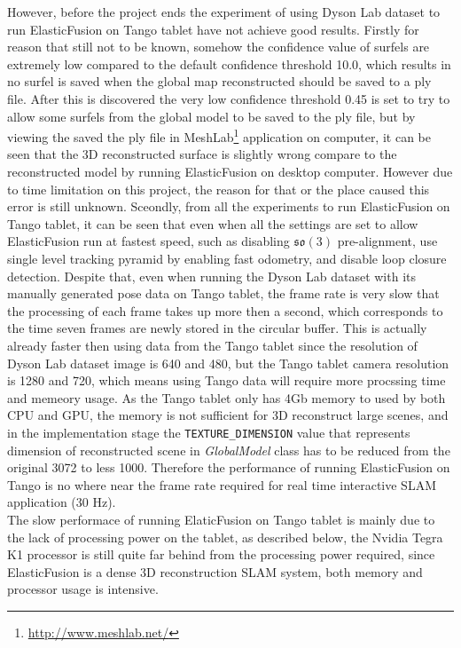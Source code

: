 \documentclass[12pt,twoside]{article}
\begin{document}
However, before the project ends the experiment of using Dyson Lab dataset to run ElasticFusion on Tango tablet have not achieve good results. Firstly for reason that still not to be known, somehow the confidence value of surfels are extremely low compared to the default confidence threshold 10.0, which results in no surfel is saved when the global map reconstructed should be saved to a ply file. After this is discovered the very low confidence threshold 0.45 is set to try to allow some surfels from the global model to be saved to the ply file, but by viewing the saved the ply file in MeshLab\footnote{\url{http://www.meshlab.net/}} application on computer, it can be seen that the 3D reconstructed surface is slightly wrong compare to the reconstructed model by running ElasticFusion on desktop computer. However due to time limitation on this project, the reason for that or the place caused this error is still unknown. Sceondly, from all the experiments to run ElasticFusion on Tango tablet, it can be seen that even when all the settings are set to allow ElasticFusion run at fastest speed, such as disabling $\mathfrak{so}(3)$ pre-alignment, use single level tracking pyramid by enabling fast odometry, and disable loop closure detection. Despite that, even when running the Dyson Lab dataset with its manually generated pose data on Tango tablet, the frame rate is very slow that the processing of each frame takes up more then a second, which corresponds to the time seven frames are newly stored in the circular buffer. This is actually already faster then using data from the Tango tablet since the resolution of Dyson Lab dataset image is 640 and 480, but the Tango tablet camera resolution is 1280 and 720, which means using Tango data will require more procssing time and memeory usage. As the Tango tablet only has 4Gb memory to used by both CPU and GPU, the memory is not sufficient for 3D reconstruct large scenes, and in the implementation stage the \verb|TEXTURE_DIMENSION| value that represents dimension of reconstructed scene in \textit{GlobalModel} class has to be reduced from the original 3072 to less 1000. Therefore the performance of running ElasticFusion on Tango is no where near the frame rate required for real time interactive SLAM application (30 Hz).\\
The slow performace of running ElaticFusion on Tango tablet is mainly due to the lack of processing power on the tablet, as described below, the Nvidia Tegra K1 processor is still quite far behind from the processing power required, since ElasticFusion is a dense 3D reconstruction SLAM system, both memory and processor usage is intensive.\\
\end{document}
